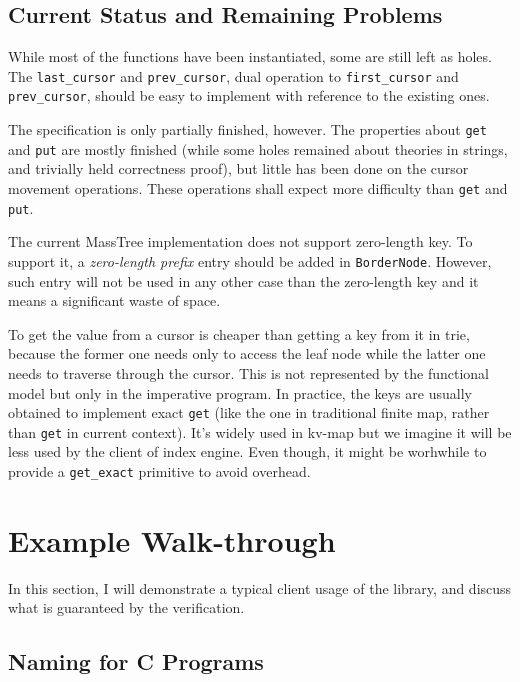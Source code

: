 \documentclass[runningheads]{llncs}
\begin{document}
\subsection{Current Status and Remaining Problems}

While most of the functions have been instantiated, some are still left as holes.
The \texttt{last\_cursor} and \texttt{prev\_cursor}, dual operation to
\texttt{first\_cursor} and \texttt{prev\_cursor}, should be easy to implement
with reference to the existing ones. 

The specification is only partially finished, however. The properties about
\texttt{get} and \texttt{put} are mostly finished (while some holes remained
about theories in strings, and trivially held correctness proof), but little has
been done on the cursor movement operations. These operations shall expect more
difficulty than \texttt{get} and \texttt{put}.

The current MassTree implementation does not support zero-length key. To support
it, a \emph{zero-length prefix} entry should be added in \texttt{BorderNode}.
However, such entry will not be used in any other case than the zero-length key
and it means a significant waste of space.

To get the value from a cursor is cheaper than getting a key from it in trie,
because the former one needs only to access the leaf node while the latter one
needs to traverse through the cursor. This is not represented by the functional
model but only in the imperative program. In practice, the keys are usually
obtained to implement exact \texttt{get} (like the one in traditional finite
map, rather than \texttt{get} in current context). It's widely used in kv-map
but we imagine it will be less used by the client of index engine. Even though,
it might be worhwhile to provide a \texttt{get\_exact} primitive to avoid
overhead.

\section{Example Walk-through}\label{walkthrough}

In this section, I will demonstrate a typical client usage of the library, and
discuss what is guaranteed by the verification.

\subsection{Naming for C Programs}
\end{document}
